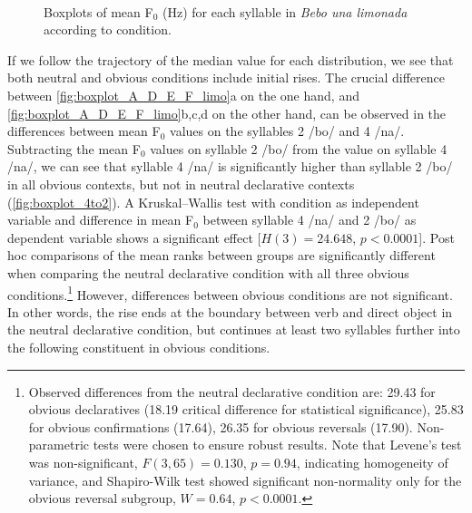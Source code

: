 \vfill
\begin{figure}[H]
	 \\
	\caption[Boxplot of mean F$_0$ for each syllable in \textit{Bebo una limonada} neutral and obvious declaratives]{Boxplots of mean F$_0$ (Hz) for each syllable in \textit{Bebo una limonada} according to condition.}\label{fig:boxplot_A_D_E_F_limo}
\end{figure}
\vfill\pagebreak

If we follow the trajectory of the median value for each distribution, we see that both neutral and obvious conditions include initial rises. The crucial difference between \autoref{fig:boxplot_A_D_E_F_limo}a on the one hand, and \autoref{fig:boxplot_A_D_E_F_limo}b,c,d on the other hand, can be observed in the differences between mean F$_0$ values on the syllables 2 /bo/ and 4 /na/. Subtracting the mean F$_0$ values on syllable 2 /bo/ from the value on syllable 4 /na/, we can see that syllable 4 /na/ is significantly higher than syllable 2 /bo/ in all obvious contexts, but not in neutral declarative contexts (\autoref{fig:boxplot_4to2}). A Kruskal–Wallis test with condition as independent variable and difference in mean F$_0$ between syllable 4 /na/ and 2 /bo/ as dependent variable shows a significant effect [$H(3) = 24.648$, $p<0.0001$]. Post hoc comparisons of the mean ranks between groups are significantly different when comparing the neutral declarative condition with all three obvious conditions.\footnote{Observed differences from the neutral declarative condition are: 29.43 for obvious declaratives (18.19 critical difference for statistical significance), 25.83 for obvious confirmations (17.64), 26.35 for obvious reversals (17.90). Non-parametric tests were chosen to ensure robust results. Note that Levene’s test was non-significant, $F(3,65) = 0.130$, $p = 0.94$, indicating homogeneity of variance, and Shapiro-Wilk test showed significant non-normality only for the obvious reversal subgroup, $W = 0.64$, $p<0.0001$.} However, differences between obvious conditions are not significant. In other words, the rise ends at the boundary between verb and direct object in the neutral declarative condition, but continues at least two syllables further into the following constituent in obvious conditions.


